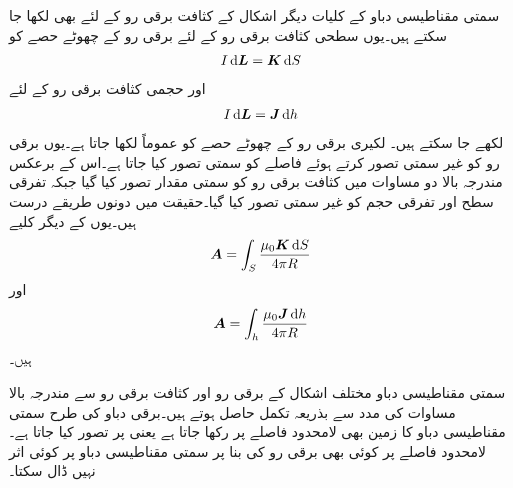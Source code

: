 سمتی مقناطیسی دباو  کے کلیات دیگر اشکال کے کثافت برقی رو کے لئے بھی لکھا جا سکتے ہیں۔یوں سطحی کثافت برقی رو  کے لئے  برقی رو کے چھوٹے حصے کو
\begin{align*}
I \dif \kvec{L}=\kvec{K} \dif S
\end{align*}
اور حجمی کثافت برقی رو  کے لئے
\begin{align*}
I \dif \kvec{L}=\kvec{J} \dif h
\end{align*}
لکھے جا سکتے ہیں۔ لکیری برقی رو کے چھوٹے حصے کو عموماً  لکھا جاتا ہے۔یوں برقی رو کو غیر سمتی تصور کرتے ہوئے فاصلے کو سمتی تصور کیا جاتا ہے۔اس کے برعکس مندرجہ بالا دو مساوات میں کثافت برقی رو کو سمتی مقدار تصور کیا گیا جبکہ تفرقی سطح  اور تفرقی حجم  کو غیر سمتی تصور کیا گیا۔حقیقت میں دونوں طریقے درست ہیں۔یوں  کے دیگر کلیے 
\begin{align}
\kvec{A}=\int_S \frac{\mu_0 \kvec{K} \dif S}{4\pi R}
\end{align}
اور
\begin{align}
\kvec{A}=\int_h \frac{\mu_0 \kvec{J} \dif h}{4\pi R}
\end{align}
ہیں۔ 

سمتی مقناطیسی دباو مختلف اشکال کے برقی رو اور کثافت برقی رو سے مندرجہ بالا مساوات کی مدد سے بذریعہ تکمل حاصل ہوتے ہیں۔برقی دباو کی طرح سمتی مقناطیسی دباو کا زمین بھی لامحدود فاصلے پر رکھا جاتا ہے یعنی  پر  تصور کیا جاتا ہے۔لامحدود فاصلے پر کوئی بھی برقی رو  کی بنا پر سمتی مقناطیسی دباو پر کوئی اثر نہیں ڈال سکتا۔
